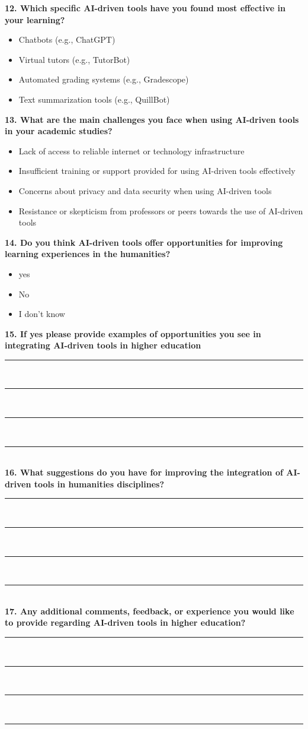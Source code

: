 \noindent\textbf{12. Which specific AI-driven tools have you found most effective in your learning?}
\begin{itemize}
	\item[\checkbox] Chatbots (e.g., ChatGPT)
	\item[\checkbox] Virtual tutors (e.g., TutorBot)
	\item[\checkbox] Automated grading systems (e.g., Gradescope)
	\item[\checkbox] Text summarization tools (e.g., QuillBot)
\end{itemize}

\noindent\textbf{13. What are the main challenges you face when using AI-driven tools in your academic studies?}
\begin{itemize}
	\item [\checkbox] Lack of access to reliable internet or technology infrastructure
	\item [\checkbox] Insufficient training or support provided for using AI-driven tools effectively
	\item [\checkbox] Concerns about privacy and data security when using AI-driven tools
	\item [\checkbox] Resistance or skepticism from professors or peers towards the use of AI-driven tools
\end{itemize}


\noindent\textbf{14. Do you think AI-driven tools offer opportunities for improving learning experiences in the humanities?}
\begin{itemize}
	\item [\circlebox] yes
	\item [\circlebox] No
	\item [\circlebox] I don't know
\end{itemize}


\noindent\textbf{15. If yes please provide examples of opportunities you see in integrating AI-driven tools in higher education}

\noindent\rule{15cm}{0.4pt} \\
\noindent\rule{15cm}{0.4pt} \\
\noindent\rule{15cm}{0.4pt} \\
\noindent\rule{15cm}{0.4pt} \\


\noindent\textbf{16. What suggestions do you have for improving the integration of AI-driven tools in humanities disciplines?}

\noindent\rule{15cm}{0.4pt} \\
\noindent\rule{15cm}{0.4pt} \\
\noindent\rule{15cm}{0.4pt} \\
\noindent\rule{15cm}{0.4pt} \\
\noindent\textbf{17. Any additional comments, feedback, or experience you would like to provide regarding AI-driven tools in higher education?}

\noindent\rule{15cm}{0.4pt} \\
\noindent\rule{15cm}{0.4pt} \\
\noindent\rule{15cm}{0.4pt} \\
\noindent\rule{15cm}{0.4pt} \\
